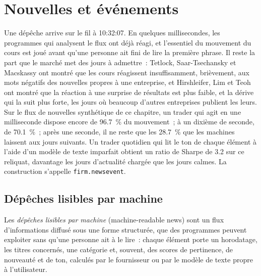 \chapter{Nouvelles et événements}\label{ch:s1:news-and-events}

Une dépêche arrive sur le fil à 10:32:07. En quelques millisecondes, les programmes qui analysent le flux ont déjà réagi, et l'essentiel du mouvement du cours est joué
avant qu'une personne ait fini de lire la première phrase. Il reste la part que le marché met des jours à admettre~: Tetlock, Saar-Tsechansky et Macskassy ont montré
que les cours réagissent insuffisamment, brièvement, aux mots négatifs des nouvelles propres à une entreprise, et Hirshleifer, Lim et Teoh ont montré que la réaction à une surprise de résultats
est plus faible, et la dérive qui la suit plus forte, les jours où beaucoup d'autres entreprises publient les leurs. Sur le flux de nouvelles synthétique de ce chapitre, un trader qui agit en une milliseconde
dispose encore de 96.7~\% du mouvement~; à un dixième de seconde, de 70.1~\%~; après une seconde, il ne reste que les 28.7~\% que les machines laissent aux
jours suivants. Un trader quotidien qui lit le ton de chaque élément à l'aide d'un modèle de texte imparfait obtient un ratio de Sharpe de 3.2 sur ce reliquat, davantage les jours d'actualité chargée que les jours calmes.
La construction s'appelle \texttt{firm.newsevent}.

\section{Dépêches lisibles par machine}

\begin{definition}\label{def:s1:news-and-events:mrn}
Les \emph{dépêches lisibles par machine} (machine-readable news) sont un flux d'informations diffusé sous une forme structurée, que des programmes peuvent exploiter sans qu'une personne ait à le lire~:
chaque élément porte un horodatage, les titres concernés, une catégorie et, souvent, des scores de pertinence, de nouveauté et de ton, calculés par le fournisseur ou
par le modèle de texte propre à l'utilisateur.
\end{definition}

